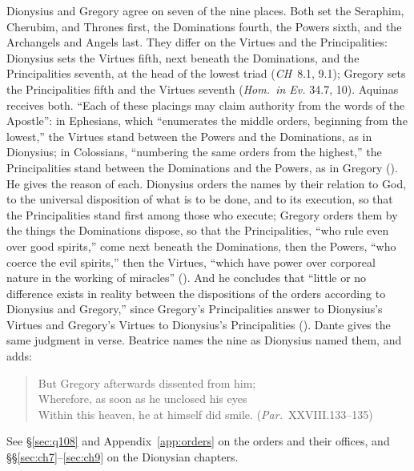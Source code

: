 Dionysius and Gregory agree on seven of the nine places. Both set the
Seraphim, Cherubim, and Thrones first, the Dominations fourth, the Powers
sixth, and the Archangels and Angels last. They differ on the Virtues and
the Principalities: Dionysius sets the Virtues fifth, next beneath the
Dominations, and the Principalities seventh, at the head of the lowest
triad (\emph{CH}~8.1, 9.1); Gregory sets the Principalities fifth and the
Virtues seventh (\emph{Hom.\ in Ev.} 34.7, 10). Aquinas receives both.
``Each of these placings may claim authority from the words of the
Apostle'': in Ephesians, which ``enumerates the middle orders, beginning
from the lowest,'' the Virtues stand between the Powers and the
Dominations, as in Dionysius; in Colossians, ``numbering the same orders
from the highest,'' the Principalities stand between the Dominations and the
Powers, as in Gregory (). He gives the reason of each. Dionysius
orders the names by their relation to God, to the universal disposition of
what is to be done, and to its execution, so that the Principalities stand
first among those who execute; Gregory orders them by the things the
Dominations dispose, so that the Principalities, ``who rule even over good
spirits,'' come next beneath the Dominations, then the Powers, ``who coerce
the evil spirits,'' then the Virtues, ``which have power over corporeal
nature in the working of miracles'' (). And he concludes
that ``little or no difference exists in reality between the dispositions
of the orders according to Dionysius and Gregory,'' since Gregory's
Principalities answer to Dionysius's Virtues and Gregory's Virtues to
Dionysius's Principalities (). Dante gives the same
judgment in verse. Beatrice names the nine as Dionysius named them, and
adds:

\begin{quote}
But Gregory afterwards dissented from him;\\
\hspace*{1.2em}Wherefore, as soon as he unclosed his eyes\\
\hspace*{1.2em}Within this heaven, he at himself did smile.
(\emph{Par.}\ XXVIII.133--135)
\end{quote}

\noindent See \S\ref{sec:q108} and Appendix~\ref{app:orders} on the orders and
their offices, and \S\S\ref{sec:ch7}--\ref{sec:ch9} on the Dionysian chapters.
